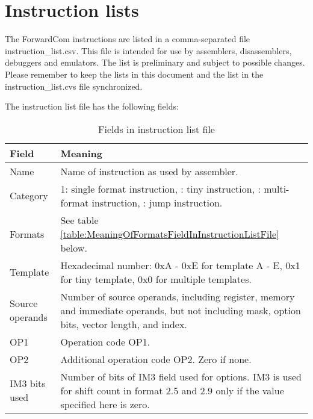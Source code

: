 \documentclass[forwardcom.tex]{subfiles}
\begin{document}
\RaggedRight

\chapter{Instruction lists}
The ForwardCom instructions are listed in a comma-separated file instruction\_list.csv. This file is intended for use by assemblers, disassemblers, debuggers and emulators. The list is preliminary and subject to possible changes. Please remember to keep the lists in this document and the list in the instruction\_list.cvs file synchronized.
\vspace{2mm}

The instruction list file has the following fields:

\begin{longtable} {|p{18mm}|p{100mm}|}
\caption{Fields in instruction list file} 
\label{table:fieldsInInstructionListFile}
\\
\endfirsthead
\endhead
\hline
\bfseries Field & \bfseries Meaning  \\
\hline
Name & Name of instruction as used by assembler.  \\
\hline
Category & 1: single format instruction, \newline
           2: tiny instruction,  \newline
           3: multi-format instruction,  \newline
           4: jump instruction. \\
\hline
Formats & See table \ref{table:MeaningOfFormatsFieldInInstructionListFile} below.  \\
\hline
Template & Hexadecimal number:  \newline
           0xA - 0xE for template A - E,  \newline
           0x1 for tiny template,  \newline
           0x0 for multiple templates. \\
\hline
Source operands & Number of source operands, including register, memory and immediate operands, but not including mask, option bits, vector length, and index. \\
\hline
OP1 & Operation code OP1. \\
\hline
OP2 & Additional operation code OP2. Zero if none. \\
\hline
IM3 bits used & Number of bits of IM3 field used for options. IM3 is used for shift count in format 2.5 and 2.9 only if the value specified here is zero. \\

\end{longtable}
\end{document}

